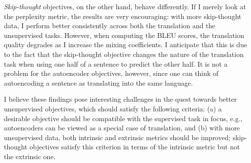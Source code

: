 {\it Skip-thought} objectives, on the other hand, behave differently. If I
merely look at the perplexity metric, the results are very encouraging: with
more skip-thought data, I perform better consistently across both the
translation and the unsupervised tasks. However, when computing the BLEU scores,
the translation quality degrades as I increase the mixing coefficients. I anticipate that
this is due to the fact that the skip-thought objective changes the nature of
the translation task when using one half of a sentence to predict the other
half. It is not a problem for the autoencoder objectives, however, since one can
think of autoencoding a sentence as translating into the same language.

I believe these findings pose interesting challenges in the quest towards  better
unsupervised objectives, which should satisfy the following criteria: (a)
a desirable objective should be compatible with the supervised task in focus, e.g.,
autoencoders can be viewed as a special case of translation,
and (b) with more unsupervised data, both intrinsic and extrinsic metrics
should be improved; skip-thought objectives satisfy this criterion in terms of
the intrinsic metric but not the extrinsic one.
